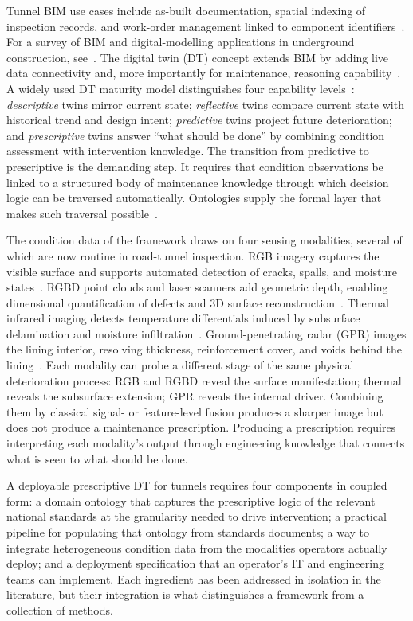 \documentclass[11pt,a4paper]{article}
\begin{document}
Tunnel BIM use cases include as-built documentation, spatial indexing of inspection records, and work-order management linked to component identifiers~\citep{Cheng2020}. For a survey of BIM and digital-modelling applications in underground construction, see~\citep{huang2021}. The digital twin (DT) concept extends BIM by adding live data connectivity and, more importantly for maintenance, reasoning capability~\citep{Tao2019,Grieves2017}. A widely used DT maturity model distinguishes four capability levels~\citep{Zhu2025,babanagar2025}: \emph{descriptive} twins mirror current state; \emph{reflective} twins compare current state with historical trend and design intent; \emph{predictive} twins project future deterioration; and \emph{prescriptive} twins answer ``what should be done'' by combining condition assessment with intervention knowledge. The transition from predictive to prescriptive is the demanding step. It requires that condition observations be linked to a structured body of maintenance knowledge through which decision logic can be traversed automatically. Ontologies supply the formal layer that makes such traversal possible~\citep{Pauwels2015,Theiler2018,Rasmussen2020}.

The condition data of the framework draws on four sensing modalities, several of which are now routine in road-tunnel inspection. RGB imagery captures the visible surface and supports automated detection of cracks, spalls, and moisture states~\citep{Cha2017,Zhao2020,Li2019}. RGBD point clouds and laser scanners add geometric depth, enabling dimensional quantification of defects and 3D surface reconstruction~\citep{Wu2025}. Thermal infrared imaging detects temperature differentials induced by subsurface delamination and moisture infiltration~\citep{Konishi2016,Jiang2026}. Ground-penetrating radar (GPR) images the lining interior, resolving thickness, reinforcement cover, and voids behind the lining~\citep{Solla2021,Lai2018,Benedetto2017,Luo2024}. Each modality can probe a different stage of the same physical deterioration process: RGB and RGBD reveal the surface manifestation; thermal reveals the subsurface extension; GPR reveals the internal driver. Combining them by classical signal- or feature-level fusion produces a sharper image but does not produce a maintenance prescription. Producing a prescription requires interpreting each modality's output through engineering knowledge that connects what is seen to what should be done.

A deployable prescriptive DT for tunnels requires four components in coupled form: a domain ontology that captures the prescriptive logic of the relevant national standards at the granularity needed to drive intervention; a practical pipeline for populating that ontology from standards documents; a way to integrate heterogeneous condition data from the modalities operators actually deploy; and a deployment specification that an operator's IT and engineering teams can implement. Each ingredient has been addressed in isolation in the literature, but their integration is what distinguishes a framework from a collection of methods.
\end{document}

